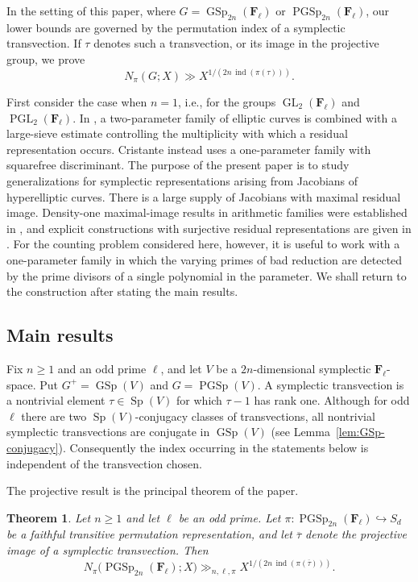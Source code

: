 \documentclass[11pt,hidelinks]{amsart}
\newtheorem{theorem}{Theorem}[section]
\newcommand{\F}{\mathbf F}
\newcommand{\GL}{\operatorname{GL}}
\newcommand{\PGL}{\operatorname{PGL}}
\newcommand{\GSp}{\operatorname{GSp}}
\newcommand{\Sp}{\operatorname{Sp}}
\newcommand{\PGSp}{\operatorname{PGSp}}
\newcommand{\ind}{\operatorname{ind}}
\begin{document}
In the setting of this paper, where
$G=\GSp_{2n}(\F_\ell)$ or $\PGSp_{2n}(\F_\ell)$, our lower bounds are
governed by the permutation index of a symplectic transvection.  If
$\tau$ denotes such a transvection, or its image in the projective
group, we prove
\[
N_\pi(G;X)
\gg
X^{1/(2n\,\operatorname{ind}(\pi(\tau)))}.
\]

First consider the case when $n=1$, i.e., for the groups $\GL_2(\F_\ell)$ and $\PGL_2(\F_\ell)$. In \cite{Ray2025}, a two-parameter family of elliptic curves is combined with a large-sieve estimate controlling the multiplicity with which a residual representation occurs. Cristante \cite{Cristante2025} instead uses a one-parameter family with squarefree discriminant. The purpose of the present paper is to study generalizations for symplectic representations arising from Jacobians of hyperelliptic curves. There is a large supply of Jacobians with maximal residual image. Density-one maximal-image results in arithmetic families were established in \cite{LandesmanEtAl2019,LandesmanEtAl2020}, and explicit constructions with surjective residual representations are given in \cite{AnniDokchitser2020}. For the counting problem considered here, however, it is useful to work with a one-parameter family in which the varying primes of bad reduction are detected by the prime divisors of a single polynomial in the parameter. We shall return to the construction after stating the main results.

\subsection{Main results}

Fix $n\geq 1$ and an odd prime $\ell$, and let $V$ be a $2n$-dimensional symplectic $\F_\ell$-space. Put $G^+=\GSp(V)$ and $G=\PGSp(V)$. A symplectic transvection is a nontrivial element $\tau\in\Sp(V)$ for which $\tau-1$ has rank one. Although for odd $\ell$ there are two $\Sp(V)$-conjugacy classes of transvections, all nontrivial symplectic transvections are conjugate in $\GSp(V)$ (see Lemma~\ref{lem:GSp-conjugacy}). Consequently the index occurring in the statements below is independent of the transvection chosen.

The projective result is the principal theorem of the paper.

\begin{theorem}\label{thm:PGSp-main}
Let $n\geq 1$ and let $\ell$ be an odd prime. Let
$\pi:\PGSp_{2n}(\F_\ell)\hookrightarrow S_d$ be a faithful transitive permutation representation, and let $\overline\tau$ denote the projective image of a symplectic transvection. Then
\[
 N_\pi\bigl(\PGSp_{2n}(\F_\ell);X\bigr)
 \gg_{n,\ell,\pi}
 X^{1/(2n\,\ind(\pi(\overline\tau)))}.
\]
\end{theorem}
\end{document}
